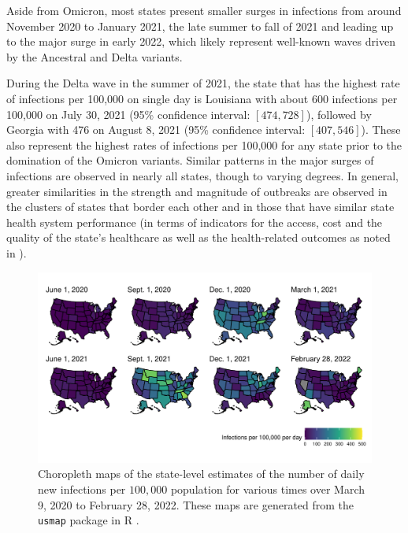 \documentclass{article}
\begin{document}
Aside from Omicron, most states present smaller surges in infections
from around November 2020 to January 2021,
the late summer to fall of 2021 and leading up to the major surge in early 2022,
which likely represent well-known waves driven by the Ancestral and Delta
variants. 

During the Delta wave in the summer of 2021, the state that has the
highest rate of infections per 100,000 on single day is Louisiana with about
600 infections per 100,000 on July 30, 2021 (95\% confidence interval:
$[474, 728]$), followed by Georgia with 476 on August 8, 2021 (95\%
confidence interval: $[407, 546]$). These also represent the highest rates of
infections per 100,000 for any state prior to the domination of the Omicron
variants. Similar patterns in the major surges of infections are observed in
nearly all states, though to varying degrees. In general, greater similarities
in the strength and magnitude of outbreaks are observed in the clusters of
states that border each other and in those that have similar state health system
performance (in terms of indicators for the access, cost and the quality of the
state's healthcare as well as the health-related outcomes as noted in
\citet{radley2020}). 

\begin{figure}[!tb]
\centering
    \includegraphics[width=.99\textwidth]{choro_inf_rates_Nov5.pdf}
    \caption{Choropleth maps of the state-level estimates of the number of 
    daily new infections per $100,000$ population for various times 
    over March 9, 2020 to February 28, 2022. These maps are generated from the \texttt{usmap} 
    package in R \citep{lorenzo2023usmap}.} 
    \label{fig:choro_inf_rates}
\end{figure}
\end{document}
